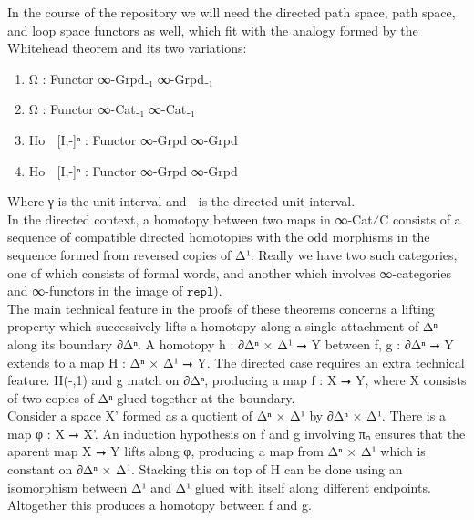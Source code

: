 \documentclass{book}
\theoremstyle{definition}
\begin{document}
In the course of the repository we will need the directed path space, path space, and loop space functors as well, which fit with the analogy formed by the Whitehead theorem and its two variations:

\begin{enumerate}
\item Ω : Functor ∞-Grpd₋₁ ∞-Grpd₋₁
\item Ω⃗ : Functor ∞-Cat₋₁ ∞-Cat₋₁
\item Ho ∘ [I⃗,-]ⁿ : Functor ∞-Grpd ∞-Grpd
\item Ho ∘ [I⃗,-]ⁿ : Functor ∞-Grpd ∞-Grpd
\end{enumerate}

Where γ is the unit interval and γ⃗ is the directed unit interval.\\

\iffalse
In the directed context, a homotopy between two maps in ∞-Cat⁄C consists of a sequence of compatible directed homotopies with the odd morphisms in the sequence formed from reversed copies of Δ¹. Really we have two such categories, one of which consists of formal words, and another which involves ∞-categories and ∞-functors in the image of $\texttt{repl}$).\\

The main technical feature in the proofs of these theorems concerns a lifting property which successively lifts a homotopy along a single attachment of Δⁿ along its boundary ∂Δⁿ. A homotopy h : ∂Δⁿ × Δ¹ ⭢ Y between f, g : ∂Δⁿ ⭢ Y extends to a map H : Δⁿ × Δ¹ ⭢ Y. The directed case requires an extra technical feature. H(-,1) and g match on ∂Δⁿ, producing a map f : X ⭢ Y, where X consists of two copies of Δⁿ glued together at the boundary.\\

Consider a space X' formed as a quotient of Δⁿ × Δ¹ by ∂Δⁿ × Δ¹. There is a map φ : X ⭢ X'. An induction hypothesis on f and g involving πₙ ensures that the aparent map X ⭢ Y lifts along φ, producing a map from Δⁿ × Δ¹ which is constant on ∂Δⁿ × Δ¹. Stacking this on top of H can be done using an isomorphism between Δ¹ and Δ¹ glued with itself along different endpoints. Altogether this produces a homotopy between f and g.\\
\end{document}
